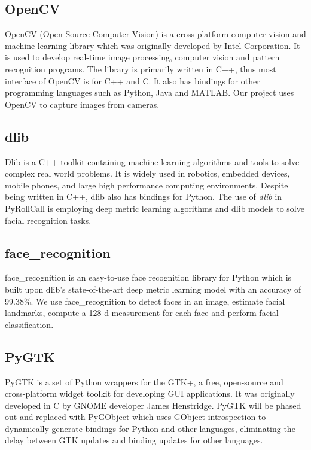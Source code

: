 
\subsection{OpenCV}  %
OpenCV (Open Source Computer Vision) is a cross-platform computer vision and machine learning library which was
originally developed by Intel Corporation. It is used to develop real-time image processing, computer vision
and pattern recognition programs. The library is primarily written in C++, thus most interface of
OpenCV is for C++ and C. It also has bindings for other programming languages such as Python, Java and MATLAB.
Our project uses OpenCV to capture images from cameras.

\subsection{dlib}  %
Dlib is a C++ toolkit containing machine learning algorithms and tools to solve complex real world problems.
It is widely used in robotics, embedded devices, mobile phones, and large high performance
computing environments. Despite being written in C++, dlib also has bindings for Python. The use of \emph{dlib}
in PyRollCall is employing deep metric learning algorithms and dlib models to solve facial recognition tasks.

\subsection{face\_recognition}  %
face\_recognition is an easy-to-use face recognition library for Python which is built upon dlib's state-of-the-art
deep metric learning model with an accuracy of 99.38\%. We use face\_recognition to detect faces in an image,
estimate facial landmarks, compute a 128-d measurement for each face and perform facial classification.

\subsection{PyGTK}  %
PyGTK is a set of Python wrappers for the GTK+, a free, open-source and cross-platform widget toolkit for
developing GUI applications. It was originally developed in C by GNOME developer James Henstridge.
PyGTK will be phased out and replaced with PyGObject which uses GObject introspection to dynamically generate
bindings for Python and other languages, eliminating the delay between GTK updates and binding updates for
other languages.
